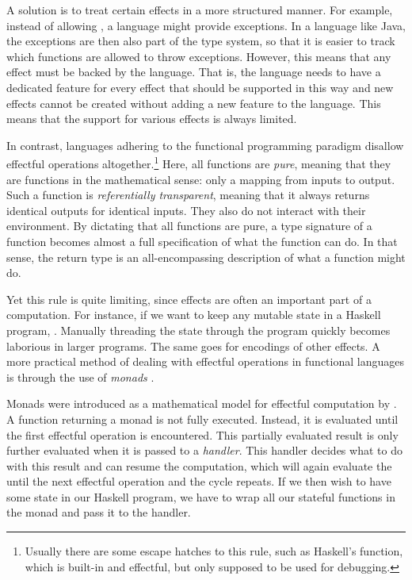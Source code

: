 A solution is to treat certain effects in a more structured manner. For example, instead of allowing , a language might provide exceptions. In a language like Java, the exceptions are then also part of the type system, so that it is easier to track which functions are allowed to throw exceptions. However, this means that any effect must be backed by the language. That is, the language needs to have a dedicated feature for every effect that should be supported in this way and new effects cannot be created without adding a new feature to the language. This means that the support for various effects is always limited.

In contrast, languages adhering to the functional programming paradigm disallow effectful operations altogether.\footnote{Usually there are some escape hatches to this rule, such as Haskell's  function, which is built-in and effectful, but only supposed to be used for debugging.} Here, all functions are \emph{pure}, meaning that they are functions in the mathematical sense: only a mapping from inputs to output. Such a function is \emph{referentially transparent}, meaning that it always returns identical outputs for identical inputs. They also do not interact with their environment. By dictating that all functions are pure, a type signature of a function becomes almost a full specification of what the function can do. In that sense, the return type is an all-encompassing description of what a function might do.



Yet this rule is quite limiting, since effects are often an important part of a computation. For instance, if we want to keep any mutable state  in a Haskell program, . Manually threading the state through the program quickly becomes laborious in larger programs. The same goes for encodings of other effects. A more practical method of dealing with effectful operations in functional languages is through the use of \emph{monads} \autocite{wadler_essence_1992,peyton_jones_imperative_1993}.

Monads were introduced as a mathematical model for effectful computation by \textcite{moggi_notions_1991}. A function returning a monad is not fully executed. Instead, it is evaluated until the first effectful operation is encountered. This partially evaluated result is only further evaluated when it is passed to a \emph{handler}. This handler decides what to do with this result and can resume the computation, which will again evaluate the until the next effectful operation and the cycle repeats. If we then wish to have some state in our Haskell program, we have to wrap all our stateful functions in the  monad and pass it to the  handler.

